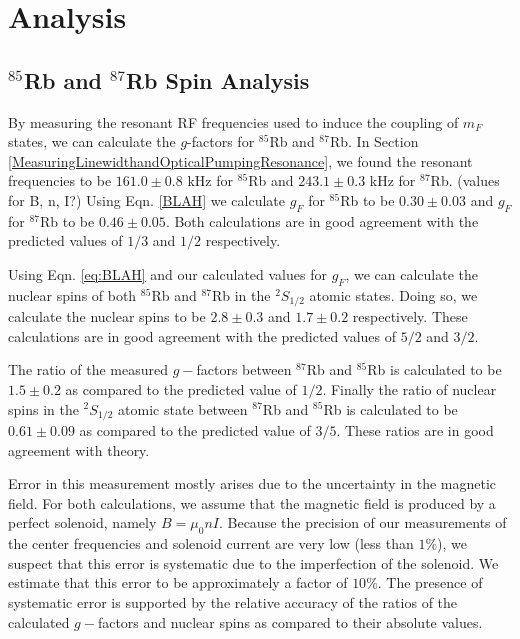 
\section{Analysis}\label{analysis}

\subsection{$^{85}$Rb and $^{87}$Rb Spin Analysis}\label{SpinAnalysis}

By measuring the resonant RF frequencies used to induce the coupling of $m_F$ states, we can calculate the $g$-factors for $^{85}$Rb and $^{87}$Rb.  In Section \ref{MeasuringLinewidthandOpticalPumpingResonance}, we found the resonant frequencies to be $161.0 \pm 0.8$ kHz for $^{85}$Rb and $243.1\pm 0.3$ kHz for $^{87}$Rb.  (values for B, n, I?) Using Eqn. \ref{BLAH} we calculate $g_F$ for $^{85}$Rb to be $0.30\pm 0.03$ and $g_F$ for $^{87}$Rb to be $0.46\pm 0.05$.  Both calculations are in good agreement with the predicted values of $1/3$ and $1/2$ respectively. 

Using Eqn. \ref{eq:BLAH} and our calculated values for $g_F$, we can calculate the nuclear spins of both $^{85}$Rb and $^{87}$Rb in the $^{2}S_{1/2}$ atomic states.  Doing so, we calculate the nuclear spins to be $2.8 \pm 0.3$ and $1.7 \pm 0.2$ respectively.  These calculations are in good agreement with the predicted values of $5/2$ and $3/2$.  

The ratio of the measured $g-$factors between $^{87}$Rb and $^{85}$Rb is calculated to be $1.5 \pm 0.2$ as compared to the predicted value of $1/2$.  Finally the ratio of nuclear spins in the $^{2}S_{1/2}$ atomic state between $^{87}$Rb and $^{85}$Rb is calculated to be $0.61\pm 0.09$ as compared to the predicted value of $3/5$.  These ratios are in good agreement with theory.

Error in this measurement mostly arises due to the uncertainty in the magnetic field.  For both calculations, we assume that the magnetic field is produced by a perfect solenoid, namely $B=\mu_0 n I$.  Because the precision of our measurements of the center frequencies and solenoid current are very low (less than $1\%$), we suspect that this error is systematic due to the imperfection of the solenoid.  We estimate that this error to be approximately a factor of $10\%$. The presence of systematic error is supported by the relative accuracy of the ratios of the calculated $g-$factors and nuclear spins as compared to their absolute values.  

